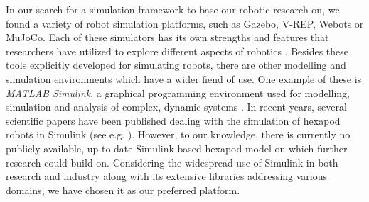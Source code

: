 In our search for a simulation framework to base our robotic research on, we found a variety of robot simulation platforms, such as Gazebo, V-REP, Webots or MuJoCo. 
Each of these simulators has its own strengths and features that researchers have utilized to explore different aspects of robotics \parencite{de2019analysis, collins2021review}.
Besides these tools explicitly developed for simulating robots, there are other modelling and simulation environments which have a wider fiend of use.
One example of these is \textit{MATLAB Simulink\textsuperscript{\textregistered}}, a graphical programming environment used for modelling, simulation and analysis of complex, dynamic systems \parencite{Simulink}.
In recent years, several scientific papers have been published dealing with the simulation of hexapod robots in Simulink (see e.g. \cite{tanaka2019development, barai2013smart, atify2019propelling}).
However, to our knowledge, there is currently no publicly available, up-to-date Simulink-based hexapod model on which further research could build on.
Considering the widespread use of Simulink in both research and industry along with its extensive libraries addressing various domains, we have chosen it as our preferred platform.



